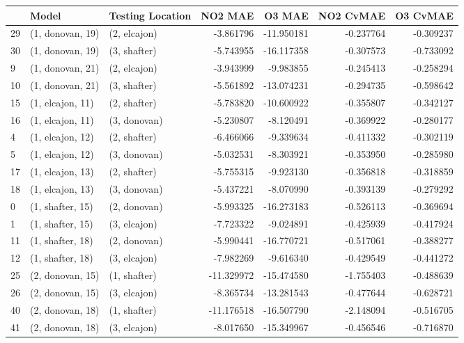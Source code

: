 \begin{tabular}{lllrrrr}
\toprule
{} &             Model & Testing Location &    NO2 MAE &     O3 MAE &  NO2 CvMAE &  O3 CvMAE \\
\midrule
29 &  (1, donovan, 19) &     (2, elcajon) &  -3.861796 & -11.950181 &  -0.237764 & -0.309237 \\
30 &  (1, donovan, 19) &     (3, shafter) &  -5.743955 & -16.117358 &  -0.307573 & -0.733092 \\
9  &  (1, donovan, 21) &     (2, elcajon) &  -3.943999 &  -9.983855 &  -0.245413 & -0.258294 \\
10 &  (1, donovan, 21) &     (3, shafter) &  -5.561892 & -13.074231 &  -0.294735 & -0.598642 \\
15 &  (1, elcajon, 11) &     (2, shafter) &  -5.783820 & -10.600922 &  -0.355807 & -0.342127 \\
16 &  (1, elcajon, 11) &     (3, donovan) &  -5.230807 &  -8.120491 &  -0.369922 & -0.280177 \\
4  &  (1, elcajon, 12) &     (2, shafter) &  -6.466066 &  -9.339634 &  -0.411332 & -0.302119 \\
5  &  (1, elcajon, 12) &     (3, donovan) &  -5.032531 &  -8.303921 &  -0.353950 & -0.285980 \\
17 &  (1, elcajon, 13) &     (2, shafter) &  -5.755315 &  -9.923130 &  -0.356818 & -0.318859 \\
18 &  (1, elcajon, 13) &     (3, donovan) &  -5.437221 &  -8.070990 &  -0.393139 & -0.279292 \\
0  &  (1, shafter, 15) &     (2, donovan) &  -5.993325 & -16.273183 &  -0.526113 & -0.369694 \\
1  &  (1, shafter, 15) &     (3, elcajon) &  -7.723322 &  -9.024891 &  -0.425939 & -0.417924 \\
11 &  (1, shafter, 18) &     (2, donovan) &  -5.990441 & -16.770721 &  -0.517061 & -0.388277 \\
12 &  (1, shafter, 18) &     (3, elcajon) &  -7.982269 &  -9.616340 &  -0.429549 & -0.441272 \\
25 &  (2, donovan, 15) &     (1, shafter) & -11.329972 & -15.474580 &  -1.755403 & -0.488639 \\
26 &  (2, donovan, 15) &     (3, elcajon) &  -8.365734 & -13.281543 &  -0.477644 & -0.628721 \\
40 &  (2, donovan, 18) &     (1, shafter) & -11.176518 & -16.507790 &  -2.148094 & -0.516705 \\
41 &  (2, donovan, 18) &     (3, elcajon) &  -8.017650 & -15.349967 &  -0.456546 & -0.716870 \\

\end{tabular}
